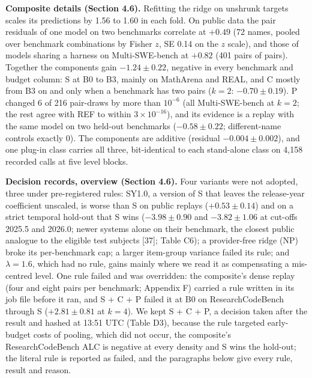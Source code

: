 \documentclass[
]{article}
\begin{document}
\textbf{Composite details (Section 4.6).} Refitting the ridge on
unshrunk targets scales its predictions by 1.56 to 1.60 in each fold. On
public data the pair residuals of one model on two benchmarks correlate
at \(+0.49\) (72 names, pooled over benchmark combinations by Fisher
\(z\), SE 0.14 on the \(z\) scale), and those of models sharing a
harness on Multi-SWE-bench at \(+0.82\) (401 pairs of pairs). Together
the components gain \(-1.24 \pm 0.22\), negative in every benchmark and
budget column: S at B0 to B3, mainly on MathArena and REAL, and C mostly
from B3 on and only when a benchmark has two pairs (\(k = 2\):
\(-0.70 \pm 0.19\)). P changed 6 of 216 pair-draws by more than
\(10^{-6}\) (all Multi-SWE-bench at \(k = 2\); the rest agree with REF
to within \(3 \times 10^{-16}\)), and its evidence is a replay with the
same model on two held-out benchmarks (\(-0.58 \pm 0.22\);
different-name controls exactly 0). The components are additive
(residual \(-0.004 \pm 0.002\)), and one plug-in class carries all
three, bit-identical to each stand-alone class on 4,158 recorded calls
at five level blocks.

\textbf{Decision records, overview (Section 4.6).} Four variants were
not adopted, three under pre-registered rules: SY1.0, a version of S
that leaves the release-year coefficient unscaled, is worse than S on
public replays (\(+0.53 \pm 0.14\)) and on a strict temporal hold-out
that S wins (\(-3.98 \pm 0.90\) and \(-3.82 \pm 1.06\) at cut-offs
2025.5 and 2026.0; newer systems alone on their benchmark, the closest
public analogue to the eligible test subjects {[}37{]}; Table C6); a
provider-free ridge (NP) broke its per-benchmark cap; a larger
item-group variance failed its rule; and \(\lambda = 1.6\), which had no
rule, gains mainly where we read it as compensating a mis-centred level.
One rule failed and was overridden: the composite's dense replay (four
and eight pairs per benchmark; Appendix F) carried a rule written in its
job file before it ran, and S + C + P failed it at B0 on
ResearchCodeBench through S (\(+2.81 \pm 0.81\) at \(k = 4\)). We kept S
+ C + P, a decision taken after the result and hashed at 13:51 UTC
(Table D3), because the rule targeted early-budget costs of pooling,
which did not occur, the composite's ResearchCodeBench ALC is negative
at every density and S wins the hold-out; the literal rule is reported
as failed, and the paragraphs below give every rule, result and reason.
\end{document}
